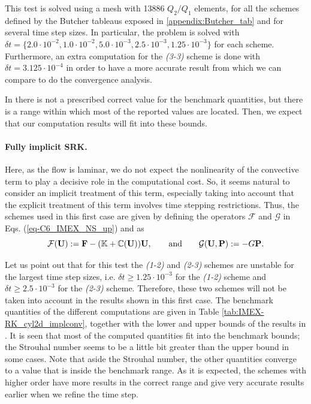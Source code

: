 This test is solved using a mesh with 13886 $Q_2/Q_1$ elements, for all the schemes defined by the Butcher tableaus exposed in \ref{appendix:Butcher_tab} and for several time step sizes. In particular, the problem is solved with $\delta t=\{2.0\cdot10^{-2},1.0\cdot10^{-2},5.0\cdot10^{-3},2.5\cdot10^{-3},1.25\cdot10^{-3}\}$ for each scheme. Furthermore, an extra computation for the \textit{(3-3)} scheme is done with $\delta t=3.125\cdot10^{-4}$ in order to have a more accurate result from which we can compare to do the convergence analysis.

In \cite{schafer_benchmark_1996} there is not a prescribed correct value for the benchmark quantities, but there is a range within which most of the reported values are located. Then, we expect that our computation results will fit into these bounds.

\paragraph{Fully implicit SRK.}

Here, as the flow is laminar, we do not expect the nonlinearity of the convective term to play a decisive role in the computational cost. So, it seems natural to consider an implicit treatment of this term, especially taking into account that the explicit treatment of this term involves time stepping restrictions. Thus, the schemes used in this first case are given by defining the operators $\mathcal{F}$ and $\mathcal{G}$ in Eqs. (\ref{eq-C6_IMEX_NS_up}) and  as
$$\mathcal{F}({\bf U}):={\bf F}-(\mathbb{K}+\mathbb{C}({\bf U})){\bf U},\quad\quad\mbox{and}\quad\quad\mathcal{G}({\bf U},{\bf P}):=-G{\bf P}.$$

Let us point out that for this test the \textit{(1-2)} and \textit{(2-3)} schemes are unstable for the largest time step sizes, {i.e.} $\delta t\geq 1.25\cdot10^{-3}$ for the \textit{(1-2)} scheme and $\delta t\geq2.5\cdot10^{-3}$ for the \textit{(2-3)} scheme. Therefore, these two schemes will not be taken into account in the results shown in this first case. The benchmark quantities of the different computations are given in Table \ref{tab:IMEX-RK_cyl2d_implconv}, together with the lower and upper bounds of the results in \cite{schafer_benchmark_1996}. It is seen that most of the computed quantities fit into the benchmark bounds; the Strouhal number seems to be a little bit greater than the upper bound in some cases. Note that aside the Strouhal number, the other quantities converge to a value that is inside the benchmark range. As it is expected, the schemes with higher order have more results in the correct range and give very accurate results earlier when we refine the time step.

